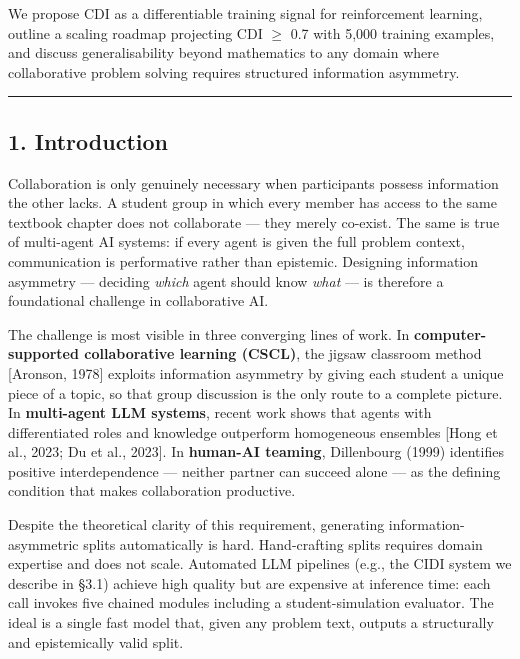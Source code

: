 \documentclass[
  11pt,
]{article}
\begin{document}
We propose CDI as a differentiable training signal for reinforcement
learning, outline a scaling roadmap projecting CDI $\geq$ 0.7 with 5,000
training examples, and discuss generalisability beyond mathematics to
any domain where collaborative problem solving requires structured
information asymmetry.

\begin{center}\rule{0.5\linewidth}{0.5pt}\end{center}

\subsection{1. Introduction}\label{introduction}

Collaboration is only genuinely necessary when participants possess
information the other lacks. A student group in which every member has
access to the same textbook chapter does not collaborate --- they merely
co-exist. The same is true of multi-agent AI systems: if every agent is
given the full problem context, communication is performative rather
than epistemic. Designing information asymmetry --- deciding
\emph{which} agent should know \emph{what} --- is therefore a
foundational challenge in collaborative AI.

The challenge is most visible in three converging lines of work. In
\textbf{computer-supported collaborative learning (CSCL)}, the jigsaw
classroom method [Aronson, 1978] exploits information asymmetry
by giving each student a unique piece of a topic, so that group
discussion is the only route to a complete picture. In
\textbf{multi-agent LLM systems}, recent work shows that agents with
differentiated roles and knowledge outperform homogeneous ensembles
{[}Hong et al., 2023; Du et al., 2023{]}. In \textbf{human-AI teaming},
Dillenbourg (1999) identifies positive interdependence --- neither
partner can succeed alone --- as the defining condition that makes
collaboration productive.

Despite the theoretical clarity of this requirement, generating
information-asymmetric splits automatically is hard. Hand-crafting
splits requires domain expertise and does not scale. Automated LLM
pipelines (e.g., the CIDI system we describe in §3.1) achieve high
quality but are expensive at inference time: each call invokes five
chained modules including a student-simulation evaluator. The ideal is a
single fast model that, given any problem text, outputs a structurally
and epistemically valid split.
\end{document}
